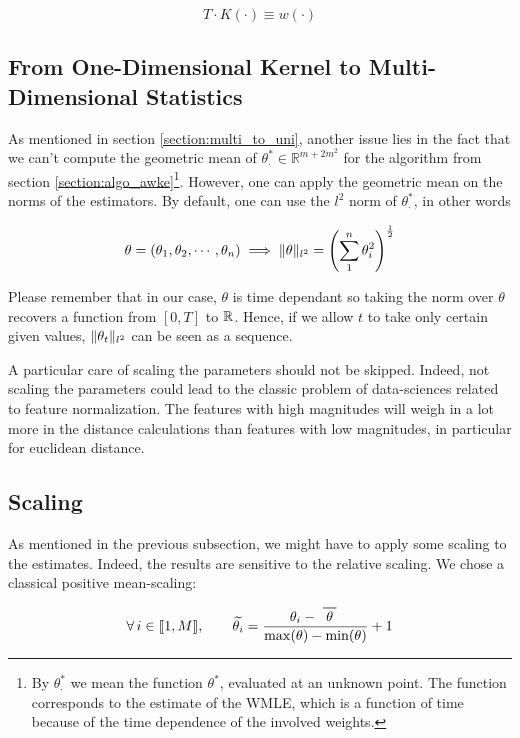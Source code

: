 \documentclass[11pt]{book}
\begin{document}
$$ T \cdot K ( \cdot ) \equiv w ( \cdot ) $$

\subsection{From One-Dimensional Kernel to Multi-Dimensional Statistics}
As mentioned in section \ref{section:multi_to_uni}, another issue lies in the fact that we can't compute the geometric mean of $\theta^*_{\cdot} \in \mathbb R^{m+2m^2}$ for the algorithm from section \ref{section:algo_awke}\footnote{By $\theta^*_{\cdot}$ we mean the function $\theta^*$, evaluated at an unknown point. The function corresponds to the estimate of the WMLE, which is a function of time because of the time dependence of the involved weights.}.
However, one can apply the geometric mean on the norms of the estimators. By default, one can use the $l^2$ norm of $\theta^*_{\cdot}$, in other words

$$\theta = (\theta_1, \theta_2, \cdots, \theta_n ) \implies 
\lVert \theta\rVert_{l^2} = \left ( \sum^n_1 \theta_i^2 \right )^{\frac 1 2}$$ 

Please remember that in our case, $\theta$ is time dependant so taking the norm over $\theta$ recovers a function from $[0,T]$ to $\mathbb{R}$. Hence, if we allow $t$ to take only certain given values, $\lVert \theta_t\rVert_{l^2}$ can be seen as a sequence.


\begin{remarque}
A particular care of scaling the parameters should not be skipped. Indeed, not scaling the parameters could lead to the classic problem of data-sciences related to feature normalization. The features with high magnitudes will weigh in a lot more in the distance calculations than features with low magnitudes, in particular for euclidean distance.
\end{remarque}

\subsection{Scaling}
\label{subsection:scaling}

As mentioned in the previous subsection, we might have to apply some scaling to the estimates. Indeed, the results are sensitive to the relative scaling. We chose a classical positive mean-scaling:

\begin{equation}
\forall i \in  \llbracket 1, M \rrbracket, \qquad  \widetilde{\theta_i } = \frac{\theta_i - \mean \theta }{\max(\theta) - \min(\theta) } + 1 
\label{rescale-function}
\end{equation}
\end{document}
